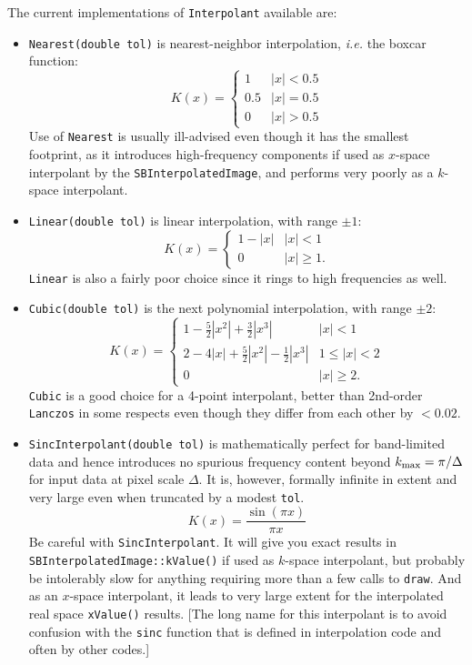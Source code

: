 \documentclass[11pt,preprint,flushrt]{aastex}
\begin{document}
The current implementations of {\tt Interpolant} available are:
\begin{itemize}
\item {\tt Nearest(double tol)} is nearest-neighbor interpolation, {\it i.e.} the boxcar function:
\begin{equation}
K(x) = \left\{ \begin{array}{cl}
1 & |x| < 0.5 \\
0.5 & |x| = 0.5 \\
0 & |x| > 0.5
\end{array}
\right.
\end{equation}
Use of {\tt Nearest} is usually ill-advised even though it has the smallest footprint, as it introduces high-frequency components if used as $x$-space interpolant by the {\tt SBInterpolatedImage}, and performs very poorly as a $k$-space interpolant. 

\item {\tt Linear(double tol)} is linear interpolation, with range $\pm 1$:
\begin{equation}
K(x) = \left\{ \begin{array}{cl}
1-|x| & |x| < 1 \\
0 & |x| \ge 1.
\end{array}
\right.
\end{equation}
{\tt Linear} is also a fairly poor choice since it rings to high frequencies as well.

\item {\tt Cubic(double tol)} is the next polynomial interpolation, with range $\pm 2$:
\begin{equation}
K(x) = \left\{ \begin{array}{cl}
1-\frac{5}{2}|x^2| + \frac{3}{2}|x^3| & |x| < 1 \\
2-4|x|+\frac{5}{2}|x^2|-\frac{1}{2}|x^3| & 1 \le |x| < 2 \\
0 & |x| \ge 2.
\end{array}
\right.
\end{equation}
{\tt Cubic} is a good choice for a 4-point interpolant, better than 2nd-order {\tt Lanczos} in some respects even though they differ from each other by $<0.02$.

\item {\tt SincInterpolant(double tol)} is mathematically perfect for band-limited data and hence introduces no spurious frequency content beyond $k_{\rm max}=\pi/\Delta$ for input data at pixel scale $\Delta$.  It is, however, formally infinite in extent and very large even when truncated by a modest {\tt tol}.  
\begin{equation}
K(x) = \frac{\sin(\pi x)}{\pi x}
\end{equation}
Be careful with {\tt SincInterpolant}.  It will give you exact results in {\tt SBInterpolatedImage::kValue()} if used as $k$-space interpolant, but probably be intolerably slow for anything requiring more than a few calls to {\tt draw}.  And as an $x$-space interpolant, it leads to very large extent for the interpolated real space {\tt xValue()} results.  [The long name for this interpolant is to avoid confusion with the {\tt sinc} function that is defined in interpolation code and often by other codes.]


\end{itemize}
\end{document}
